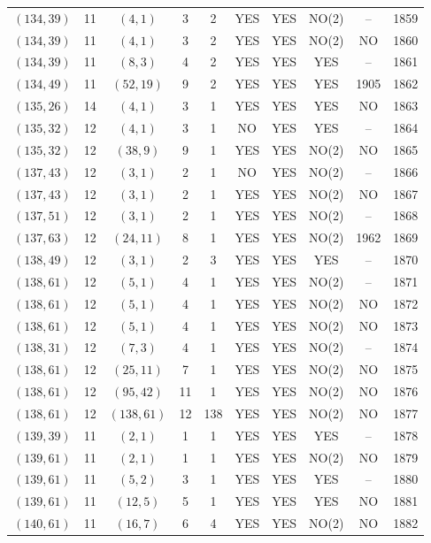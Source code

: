 \begin{longtable}{|c|c|c|c|c|c|c|c|c|c|}
$(134, 39)$ & 11 & $(4, 1)$ & 3 & 2 & YES & YES & NO(2) & -- & 1859\\
$(134, 39)$ & 11 & $(4, 1)$ & 3 & 2 & YES & YES & NO(2) & NO & 1860\\
$(134, 39)$ & 11 & $(8, 3)$ & 4 & 2 & YES & YES & YES & -- & 1861\\
$(134, 49)$ & 11 & $(52, 19)$ & 9 & 2 & YES & YES & YES & 1905 & 1862\\
$(135, 26)$ & 14 & $(4, 1)$ & 3 & 1 & YES & YES & YES & NO & 1863\\
$(135, 32)$ & 12 & $(4, 1)$ & 3 & 1 & NO & YES & YES & -- & 1864\\
$(135, 32)$ & 12 & $(38, 9)$ & 9 & 1 & YES & YES & NO(2) & NO & 1865\\
$(137, 43)$ & 12 & $(3, 1)$ & 2 & 1 & NO & YES & NO(2) & -- & 1866\\
$(137, 43)$ & 12 & $(3, 1)$ & 2 & 1 & YES & YES & NO(2) & NO & 1867\\
$(137, 51)$ & 12 & $(3, 1)$ & 2 & 1 & YES & YES & NO(2) & -- & 1868\\
$(137, 63)$ & 12 & $(24, 11)$ & 8 & 1 & YES & YES & NO(2) & 1962 & 1869\\
$(138, 49)$ & 12 & $(3, 1)$ & 2 & 3 & YES & YES & YES & -- & 1870\\
$(138, 61)$ & 12 & $(5, 1)$ & 4 & 1 & YES & YES & NO(2) & -- & 1871\\
$(138, 61)$ & 12 & $(5, 1)$ & 4 & 1 & YES & YES & NO(2) & NO & 1872\\
$(138, 61)$ & 12 & $(5, 1)$ & 4 & 1 & YES & YES & NO(2) & NO & 1873\\
$(138, 31)$ & 12 & $(7, 3)$ & 4 & 1 & YES & YES & NO(2) & -- & 1874\\
$(138, 61)$ & 12 & $(25, 11)$ & 7 & 1 & YES & YES & NO(2) & NO & 1875\\
$(138, 61)$ & 12 & $(95, 42)$ & 11 & 1 & YES & YES & NO(2) & NO & 1876\\
$(138, 61)$ & 12 & $(138, 61)$ & 12 & 138 & YES & YES & NO(2) & NO & 1877\\
$(139, 39)$ & 11 & $(2, 1)$ & 1 & 1 & YES & YES & YES & -- & 1878\\
$(139, 61)$ & 11 & $(2, 1)$ & 1 & 1 & YES & YES & NO(2) & NO & 1879\\
$(139, 61)$ & 11 & $(5, 2)$ & 3 & 1 & YES & YES & YES & -- & 1880\\
$(139, 61)$ & 11 & $(12, 5)$ & 5 & 1 & YES & YES & YES & NO & 1881\\
$(140, 61)$ & 11 & $(16, 7)$ & 6 & 4 & YES & YES & NO(2) & NO & 1882\\

\end{longtable}
